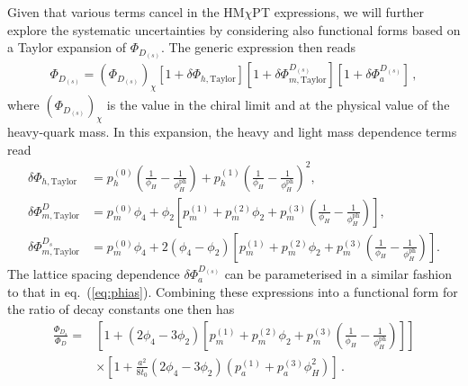 Given that various terms cancel in the  HM$\chi$PT expressions, we will further explore the systematic uncertainties by considering  also functional forms based on a Taylor expansion of $\Phi_{D_{(s)}}$. The generic
expression then reads
\begin{align}
	\Phi_{D_{(s)}}= \left( \Phi_{D_{(s)}}\right)_{\chi} \left[ 1 + \delta \Phi_{{h,\mathrm{Taylor}}} \right] \left[ 1 + \delta \Phi_{{m,\mathrm{Taylor}}}^{D_{(s)}} \right] \left[ 1 + \delta \Phi_a^{D_{(s)}}  \right]
	\,,
	\label{eq:phiqcontT}
\end{align}
where $ \left( \Phi_{D_{(s)}}\right)_{\chi}$ is the value in
the chiral limit and at the physical value of the heavy-quark mass.
In this expansion, the heavy and light mass dependence terms read
\begin{equation}
	\begin{split}
		\delta \Phi_{{h,\mathrm{Taylor}}} &=  p_h^{(0)} \left( \frac{1}{\phi_H} - \frac{1}{\phi_H^{\mathrm{ph}}} \right) + p_h^{(1)} \left( \frac{1}{\phi_H} - \frac{1}{\phi_H^{\mathrm{ph}}} \right)^2 ,
		\\
		\delta \Phi_{{m,\mathrm{Taylor}}}^{D} &=  p_m^{(0)} \phi_4 + \phi_2 \left[ p_m^{(1)}  +  p_m^{(2)} \phi_2 + p_m^{(3)} \left( \frac{1}{\phi_H} - \frac{1}{\phi_H^{\mathrm{ph}}} \right)  \right] ,
		\\
		\delta \Phi_{{m,\mathrm{Taylor}}}^{D_s} &=  p_m^{(0)} \phi_4 + 2 (\phi_4 - \phi_2)  \left[ p_m^{(1)}  + p_m^{(2)} \phi_2 + p_m^{(3)} \left( \frac{1}{\phi_H} - \frac{1}{\phi_H^{\mathrm{ph}}} \right)  \right].
		\label{eq:deltaphiTs} 
	\end{split}
\end{equation}
The lattice spacing dependence  $\delta \Phi_{a}^{D_{(s)}}$ can be parameterised in a similar fashion to that in eq.~(\ref{eq:phias}).
Combining these expressions into a functional form for the ratio of decay constants one then has
\begin{align}
	\frac{\Phi_{D_s}}{\Phi_D}   =& \left[  1 +  \left( 2 \phi_4 - 3 \phi_2 \right)  \left[ p_m^{(1)}  +  p_m^{(2)} \phi_2 + p_m^{(3)} \left( \frac{1}{\phi_H} - \frac{1}{\phi_H^{\mathrm{ph}}} \right) \right]  \right]  
	\nonumber \\
	& \times \left[ 1+ \frac{a^2}{8t_0}  \left( 2 \phi_4 - 3 \phi_2 \right) \left( p_a^{(1)} + p_a^{(3)} \phi_H^2 \right)  \right] \,.
	\label{eq:ratiophiT}
\end{align}

